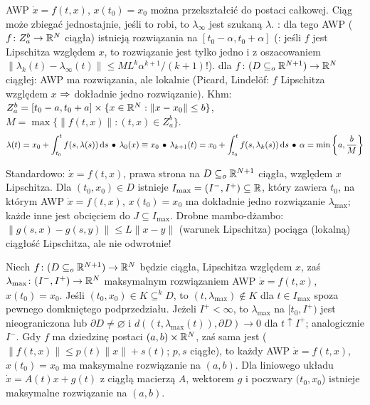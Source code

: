 AWP $\dot x = f(t,x)$, $x(t_0) = x_0$  można  przekształcić  do postaci całkowej.
Ciąg  może zbiegać jednostajnie, jeśli to robi, to $\lambda_\infty$ jest szukaną $\lambda$.
: dla tego AWP ($f \colon Z_a^b \to \mathbb{R}^N$ ciągła) istnieją  rozwiązania na $[t_0 - \alpha, t_0+\alpha]$ (: jeśli $f$ jest Lipschitza względem $x$, to rozwiązanie jest tylko jedno i z oszacowaniem $\|\lambda_k(t) - \lambda_\infty(t)\| \le {ML^k \alpha^{k+1}}/{(k+1)!}$).
 dla $f \colon (D \subseteq_o \mathbb{R}^{N+1}) \to \mathbb{R}^N$ ciągłej: AWP ma rozwiązania, ale lokalnie (Picard, Lindelöf: $f$ Lipschitza względem $x$ $\Rightarrow$ dokładnie jedno rozwiązanie).
Khm: $Z_a^b = [t_0 - a, t_0 + a] \times \{x \in \mathbb{R}^N : \|x-x_0\| \le b\}$, $M = \max \{\|f(t,x)\| : (t,x) \in Z_a^b\}$.
\[
	\lambda(t) = x_0 + \int_{t_0}^t f(s, \lambda(s)) \,\textrm{d}s \spk
	\lambda_0(x) \equiv x_0 \spk
	\lambda_{k+1}(t) = x_0 + \int_{t_0}^t f(s, \lambda_k(s)) \,\textrm{d}s \spk
	\alpha = \min \left\{a, \frac b M \right\}%
\]

Standardowo:  $\dot x = f(t, x)$, prawa strona na $D \subseteq_o \mathbb{R}^{N+1}$ ciągła, względem $x$ Lipschitza.
Dla $(t_0, x_0) \in D$ istnieje $I_{\max} = (I^-, I^+) \subseteq \mathbb{R}$, który zawiera $t_0$, na którym AWP $\dot x = f(t,x)$, $x(t_0) = x_0$ ma dokładnie jedno rozwiązanie $\lambda_{\max}$; każde inne jest obcięciem do $J \subseteq I_{\max}$.
Drobne mambo-dżambo: $\|g(s, x) - g(s,y)\| \le L\|x-y\|$ (warunek Lipschitza) pociąga (lokalną) ciągłość Lipschitza, ale nie odwrotnie!

Niech $f \colon (D \subseteq_o \mathbb{R}^{N+1}) \to \mathbb{R}^N$ będzie  ciągła, Lipschitza względem $x$, zaś $\lambda_{\max} \colon (I^-, I^+) \to \mathbb{R}^N$ maksymalnym rozwiązaniem AWP $\dot x = f(t,x)$, $x(t_0) = x_0$.
Jeśli $(t_0, x_0) \in K \subseteq^k D$, to $(t, \lambda_{\max}) \not \in K$ dla $t \in I_{\max}$ spoza pewnego domkniętego podprzedziału.
Jeżeli $I^+ < \infty$, to $\lambda_{\max}$ na $[t_0, I^+)$ jest nieograniczona lub $\partial D \neq \varnothing$ i $d((t, \lambda_{\max}(t)), \partial D) \to 0$ dla $t \uparrow I^+$; analogicznie $I^-$.
Gdy $f$ ma dziedzinę postaci $(a,b) \times \mathbb{R}^N$, zaś sama jest  ($\|f(t,x)\| \le p(t) \|x\| + s(t)$; $p, s$ ciągłe), to każdy AWP $\dot x = f(t,x)$, $x(t_0) = x_0$ ma maksymalne rozwiązanie na $(a,b)$.
Dla liniowego układu $\dot x = A(t)x+ g(t)$ z ciągłą macierzą $A$, wektorem $g$ i poczwary $(t_0,x_0$) istnieje maksymalne rozwiązanie na $(a,b)$.

